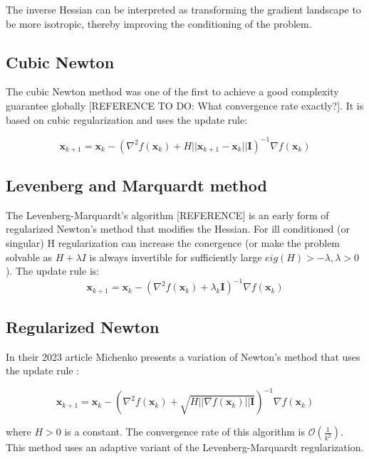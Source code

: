 \documentclass{article}
\begin{document}
The inverse Hessian can be interpreted as transforming the gradient landscape to be more isotropic, thereby improving the conditioning of the problem. 

\subsection{Cubic Newton}

The cubic Newton method was one of the first to achieve a good complexity guarantee globally [REFERENCE TO DO: What convergence rate exactly?]. It is based on cubic regularization and uses the update rule:

\begin{equation}
\mathbf{x}_{k+1} = \mathbf{x}_{k} - ( \nabla^2 f(\mathbf{x}_k) + H ||\mathbf{x}_{k+1} - \mathbf{x}_{k}||\mathbf{I})^{-1} \nabla f(\mathbf{x}_k)
\end{equation}

\subsection{Levenberg and Marquardt method}

The Levenberg-Marquardt's algorithm [REFERENCE] is an early form of regularized Newton's method that modifies the Hessian. For ill conditioned (or singular) H regularization can increase the conergence (or make the problem solvable as $H + \lambda I$ is always invertible for sufficiently large $eig(H)> - \lambda, \lambda > 0$). The update rule is:
\begin{equation}
\mathbf{x}_{k+1} = \mathbf{x}_{k} - ( \nabla^2 f(\mathbf{x}_k) + \lambda_k \mathbf{I})^{-1} \nabla f(\mathbf{x}_k)
\end{equation}

\subsection{Regularized Newton}

In their 2023 article Michenko presents a variation of Newton's method that uses the update rule \cite{mishchenko2023regularized}:

\begin{equation}
\mathbf{x}_{k+1} = \mathbf{x}_{k} - ( \nabla^2 f(\mathbf{x}_k) + \sqrt{ H ||\nabla f(\mathbf{x}_k)||\mathbf{I}})^{-1} \nabla f(\mathbf{x}_k)
  \label{eq:regularized-newton}
\end{equation}

where $H > 0$ is a constant. The convergence rate of this algorithm is $\mathcal{O}(\frac{1}{k^2})$. This method uses an adaptive variant of the Levenberg-Marquardt regularization. 
\end{document}
